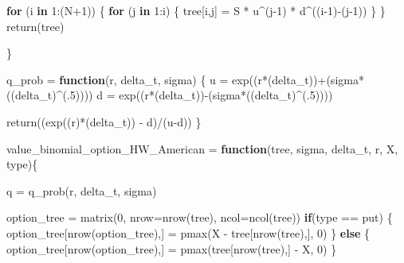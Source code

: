 \documentclass[
]{article}
\newenvironment{Shaded}{\begin{snugshade}}{\end{snugshade}}
\newcommand{\AttributeTok}[1]{\textcolor[rgb]{0.77,0.63,0.00}{#1}}
\newcommand{\ControlFlowTok}[1]{\textcolor[rgb]{0.13,0.29,0.53}{\textbf{#1}}}
\newcommand{\DecValTok}[1]{\textcolor[rgb]{0.00,0.00,0.81}{#1}}
\newcommand{\FunctionTok}[1]{\textcolor[rgb]{0.00,0.00,0.00}{#1}}
\newcommand{\NormalTok}[1]{#1}
\newcommand{\OtherTok}[1]{\textcolor[rgb]{0.56,0.35,0.01}{#1}}
\newcommand{\SpecialCharTok}[1]{\textcolor[rgb]{0.00,0.00,0.00}{#1}}
\newcommand{\StringTok}[1]{\textcolor[rgb]{0.31,0.60,0.02}{#1}}
\begin{document}
\begin{Shaded}
\begin{Highlighting}[]
  \ControlFlowTok{for}\NormalTok{ (i }\ControlFlowTok{in} \DecValTok{1}\SpecialCharTok{:}\NormalTok{(N}\SpecialCharTok{+}\DecValTok{1}\NormalTok{)) \{}
    \ControlFlowTok{for}\NormalTok{ (j }\ControlFlowTok{in} \DecValTok{1}\SpecialCharTok{:}\NormalTok{i) \{}
\NormalTok{      tree[i,j] }\OtherTok{=}\NormalTok{ S }\SpecialCharTok{*}\NormalTok{ u}\SpecialCharTok{\^{}}\NormalTok{(j}\DecValTok{{-}1}\NormalTok{) }\SpecialCharTok{*}\NormalTok{ d}\SpecialCharTok{\^{}}\NormalTok{((i}\DecValTok{{-}1}\NormalTok{)}\SpecialCharTok{{-}}\NormalTok{(j}\DecValTok{{-}1}\NormalTok{))}
\NormalTok{    \}}
\NormalTok{  \}}
  \FunctionTok{return}\NormalTok{(tree)}
  
\NormalTok{\}}

\NormalTok{q\_prob }\OtherTok{=} \ControlFlowTok{function}\NormalTok{(r, delta\_t, sigma) \{}
\NormalTok{  u }\OtherTok{=} \FunctionTok{exp}\NormalTok{((r}\SpecialCharTok{*}\NormalTok{(delta\_t))}\SpecialCharTok{+}\NormalTok{(sigma}\SpecialCharTok{*}\NormalTok{((delta\_t)}\SpecialCharTok{\^{}}\NormalTok{(.}\DecValTok{5}\NormalTok{))))}
\NormalTok{  d }\OtherTok{=} \FunctionTok{exp}\NormalTok{((r}\SpecialCharTok{*}\NormalTok{(delta\_t))}\SpecialCharTok{{-}}\NormalTok{(sigma}\SpecialCharTok{*}\NormalTok{((delta\_t)}\SpecialCharTok{\^{}}\NormalTok{(.}\DecValTok{5}\NormalTok{))))}
  
  \FunctionTok{return}\NormalTok{((}\FunctionTok{exp}\NormalTok{((r)}\SpecialCharTok{*}\NormalTok{(delta\_t)) }\SpecialCharTok{{-}}\NormalTok{ d)}\SpecialCharTok{/}\NormalTok{(u}\SpecialCharTok{{-}}\NormalTok{d))}
\NormalTok{\}}


\NormalTok{value\_binomial\_option\_HW\_American }\OtherTok{=} \ControlFlowTok{function}\NormalTok{(tree, sigma, delta\_t, r, X, type)\{}
  
\NormalTok{  q }\OtherTok{=} \FunctionTok{q\_prob}\NormalTok{(r, delta\_t, sigma)}
  
\NormalTok{  option\_tree }\OtherTok{=} \FunctionTok{matrix}\NormalTok{(}\DecValTok{0}\NormalTok{, }\AttributeTok{nrow=}\FunctionTok{nrow}\NormalTok{(tree), }\AttributeTok{ncol=}\FunctionTok{ncol}\NormalTok{(tree))}
  \ControlFlowTok{if}\NormalTok{(type }\SpecialCharTok{==} \StringTok{\textquotesingle{}put\textquotesingle{}}\NormalTok{) \{}
\NormalTok{    option\_tree[}\FunctionTok{nrow}\NormalTok{(option\_tree),] }\OtherTok{=} \FunctionTok{pmax}\NormalTok{(X }\SpecialCharTok{{-}}\NormalTok{ tree[}\FunctionTok{nrow}\NormalTok{(tree),], }\DecValTok{0}\NormalTok{)}
\NormalTok{  \} }\ControlFlowTok{else}\NormalTok{ \{}
\NormalTok{    option\_tree[}\FunctionTok{nrow}\NormalTok{(option\_tree),] }\OtherTok{=} \FunctionTok{pmax}\NormalTok{(tree[}\FunctionTok{nrow}\NormalTok{(tree),] }\SpecialCharTok{{-}}\NormalTok{ X, }\DecValTok{0}\NormalTok{)}
\NormalTok{  \}}
  

\end{Highlighting}
\end{Shaded}
\end{document}
